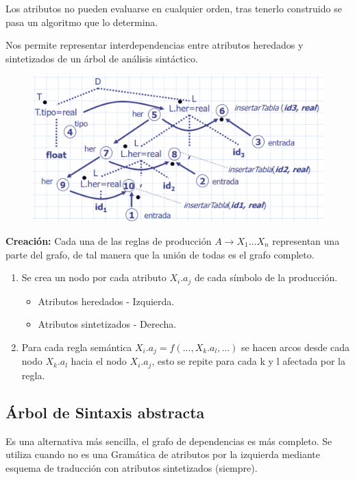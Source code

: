 \documentclass[12pt, twoside, openright]{report} %
\begin{document}
Los atributos no pueden evaluarse en cualquier orden, tras tenerlo construido se pasa un algoritmo que lo determina.

Nos permite representar interdependencias entre atributos heredados y sintetizados de un árbol de análisis sintáctico.

\begin{figure}[H]
  {\includegraphics[scale=.25]{2021-05-01 01_15_15-05_resum_Sem_2021.pdf - Foxit Reader.png}}
\end{figure}

\textbf{Creación:} Cada una de las reglas de producción $A \rightarrow X_1 ... X_n$ representan una parte del grafo, de tal manera que la unión de todas es el grafo completo.
\begin{enumerate}
  \item Se crea un nodo por cada atributo $X_i.a_j$ de cada símbolo de la producción.
  \begin{itemize}
    \item Atributos heredados - Izquierda.
    \item Atributos sintetizados - Derecha.
  \end{itemize}
  \item Para cada regla semántica $X_i.a_j = f(...,X_k.a_l, ...)$ se hacen arcos desde cada nodo $X_k.a_l$ hacia el nodo $X_i.a_j$, esto se repite para cada k y l afectada por la regla.
\end{enumerate}
\pagebreak
\subsection{Árbol de Sintaxis abstracta}
Es una alternativa más sencilla, el grafo de dependencias es más completo. Se utiliza cuando no es una Gramática de atributos por la izquierda mediante esquema de traducción con atributos sintetizados (siempre).
\end{document}
